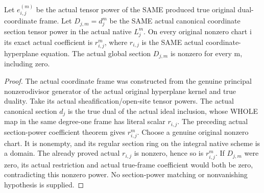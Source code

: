 \begin{definition}
\label{def:seven-native-coordinate-tensor-frames-and-sections}
\leanok
Let $e_{i,j}^{(m)}$ be the actual tensor power of the SAME produced true
original dual-coordinate frame. Let $D_{j,m}=d_j^m$ be the SAME actual
canonical coordinate section tensor power in the actual native $L_j^m$.
On every original nonzero chart i its exact actual coefficient is
$r_{i,j}^m$, where $r_{i,j}$ is the SAME actual coordinate-hyperplane equation.
The actual global section $D_{j,m}$ is nonzero for every m, including zero.
\end{definition}
\begin{proof}
The actual coordinate frame was constructed from the genuine principal
nonzerodivisor generator of the actual original hyperplane kernel and true
duality. Take its actual sheafification/open-site tensor powers. The actual
canonical section $d_j$ is the true dual of the actual ideal inclusion, whose
WHOLE map in the same degree-one frame has literal scalar $r_{i,j}$.
The preceding actual section-power coefficient theorem gives $r_{i,j}^m$.
Choose a genuine original nonzero chart. It is nonempty, and its regular
section ring on the integral native scheme is a domain. The already proved
actual $r_{i,j}$ is nonzero, hence so is $r_{i,j}^m$. If $D_{j,m}$ were zero, its
actual restriction and actual true-frame coefficient would both be zero,
contradicting this nonzero power. No section-power matching or nonvanishing
hypothesis is supplied.
\end{proof}

